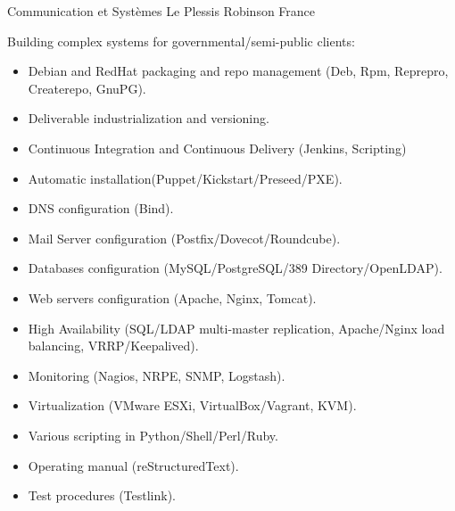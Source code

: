 \documentclass[10pt,a4paper,sans]{moderncv}        %
\begin{document}
        {Communication et Systèmes}
        {Le Plessis Robinson}
        {France}
        {Building complex systems for governmental/semi-public clients:
        \begin{itemize}
        \item Debian and RedHat packaging and repo management (Deb, Rpm, Reprepro, Createrepo, GnuPG).
        \item Deliverable industrialization and versioning.
        \item Continuous Integration and Continuous Delivery (Jenkins, Scripting)
        \item Automatic installation(Puppet/Kickstart/Preseed/PXE).
        \item DNS configuration (Bind).
        \item Mail Server configuration (Postfix/Dovecot/Roundcube).
        \item Databases  configuration (MySQL/PostgreSQL/389 Directory/OpenLDAP).
        \item Web servers configuration (Apache, Nginx, Tomcat).
        \item High Availability (SQL/LDAP multi-master replication, Apache/Nginx load balancing, VRRP/Keepalived).
        \item Monitoring (Nagios, NRPE, SNMP, Logstash).
        \item Virtualization (VMware ESXi, VirtualBox/Vagrant, KVM).
        \item Various scripting in Python/Shell/Perl/Ruby.
        \item Operating manual (reStructuredText).
        \item Test procedures (Testlink).
        \end{itemize}
        }
\end{document}
